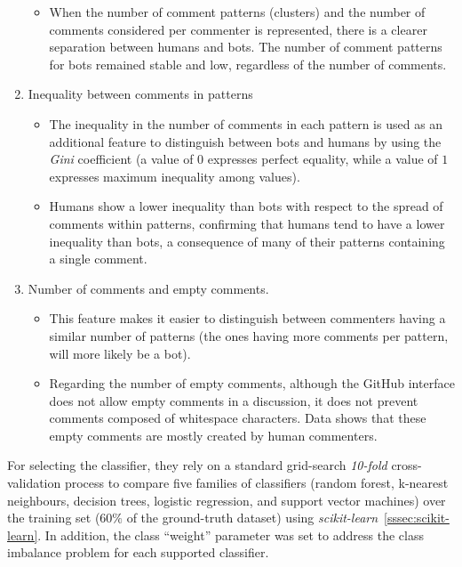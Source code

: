 \documentclass[a4paper, 12pt]{book}
\begin{document}
\begin{enumerate}
\begin{itemize}
            \item When the number of comment patterns (clusters) and the number of comments considered per commenter is represented, there is a clearer separation between humans and bots. The number of comment patterns for bots remained stable and low, regardless of the number of comments.
        \end{itemize}
    \item Inequality between comments in patterns
        \begin{itemize}
            \item The inequality in the number of comments in each pattern is used as an additional feature to distinguish between bots and humans by using the \textit{Gini} coefficient (a value of $0$ expresses perfect equality, while a value of $1$ expresses maximum inequality among values).
            \item Humans show a lower inequality than bots with respect to the spread of comments within patterns, confirming that humans tend to have a lower inequality than bots, a consequence of many of their patterns containing a single comment.
        \end{itemize}
    \item Number of comments and empty comments.
        \begin{itemize}
            \item This feature makes it easier to distinguish between commenters having a similar number of patterns (the ones having more comments per pattern, will more likely be a bot). 
            \item Regarding the number of empty comments, although the GitHub interface does not allow empty comments in a discussion, it does not prevent comments composed of whitespace characters. Data shows that these empty comments are mostly created by human commenters.
        \end{itemize}
\end{enumerate}

For selecting the classifier, they rely on a standard grid-search \textit{10-fold} cross-validation process to compare five families of classifiers (random forest, k-nearest neighbours, decision trees, logistic regression, and support vector machines) over the training set ($60\%$ of the ground-truth dataset) using \textit{scikit-learn}~\ref{sssec:scikit-learn}. In addition, the class ``weight'' parameter was set to address the class imbalance problem for each supported classifier.
\end{document}
